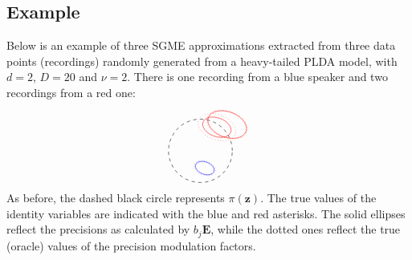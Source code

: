 \documentclass[a4paper,oneside,12pt,english]{report}
\def\zvec{\mathbf{z}}
\def\Emat{\mathbf{E}}
\begin{document}
\subsection{Example}
Below is an example of three SGME approximations extracted from three data points (recordings) randomly generated from a heavy-tailed PLDA model, with $d=2$, $D=20$ and $\nu=2$. There is one recording from a blue speaker and two recordings from a red one: 
$$
\begin{tikzpicture}[xscale=1,yscale=1]
\draw[rotate around ={   0:(   0,   0)},black, dashed] (   0,   0) ellipse [x radius=   1, y radius=   1];
\draw[rotate around ={69.3:(0.137,-0.545)},blue] (0.137,-0.545) ellipse [x radius=0.194, y radius=0.304];
\draw[rotate around ={69.3:(0.517,0.746)},red] (0.517,0.746) ellipse [x radius=0.295, y radius=0.462];
\draw[rotate around ={69.3:(0.839,0.83)},red] (0.839,0.83) ellipse [x radius=0.401, y radius=0.629];
\draw[rotate around ={69.3:(0.137,-0.545)},blue, dotted] (0.137,-0.545) ellipse [x radius=0.217, y radius=0.34];
\draw[rotate around ={69.3:(0.517,0.746)},red, dotted] (0.517,0.746) ellipse [x radius=0.395, y radius=0.619];
\draw[rotate around ={69.3:(0.839,0.83)},red, dotted] (0.839,0.83) ellipse [x radius=0.42, y radius=0.658];
\draw[blue] plot[mark = asterisk] coordinates {(0.3252,-0.4289)};
\draw[red] plot[mark = asterisk] coordinates {(0.0116,0.7313)};
\end{tikzpicture}
$$
As before, the dashed black circle represents $\pi(\zvec)$. The true values of the identity variables are indicated with the blue and red asterisks. The solid ellipses reflect the precisions as calculated by $b_j\Emat$, while the dotted ones reflect the true (oracle) values of the precision modulation factors. 
\end{document}
